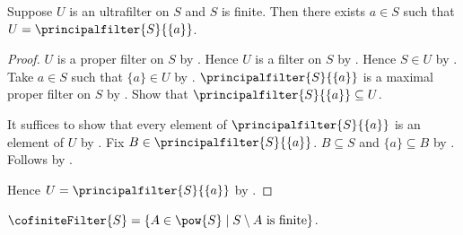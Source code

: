 \begin{theorem}\label{ultrafilter_on_finite_set_is_principal}
    Suppose $U$ is an ultrafilter on $S$ and $S$ is finite.
    Then there exists $a\in S$ such that
        $U=\principalfilter{S}{\{a\}}$.
\end{theorem}
\begin{proof}
    $U$ is a proper filter on $S$ by .
    Hence $U$ is a filter on $S$ by .
    Hence $S\in U$ by .
    Take $a\in S$ such that $\{a\}\in U$
        by .
    $\principalfilter{S}{\{a\}}$ is a maximal proper filter on $S$
        by .
    Show that $\principalfilter{S}{\{a\}}\subseteq U$.
    \begin{subproof}
        It suffices to show that every element of
            $\principalfilter{S}{\{a\}}$ is an element of $U$
            by .
        Fix $B\in\principalfilter{S}{\{a\}}$.
        $B\subseteq S$ and $\{a\}\subseteq B$
            by .
        Follows by .
    \end{subproof}
    Hence $U=\principalfilter{S}{\{a\}}$
        by .
\end{proof}

\begin{definition}\label{cofinite_filter}
    $\cofiniteFilter{S}=\{A\in\pow{S}\mid
        \text{$S\setminus A$ is finite}\}$.
\end{definition}

